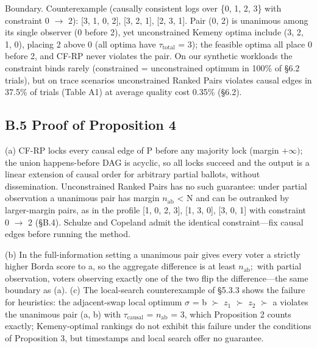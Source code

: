 \documentclass[11pt]{article}
\begin{document}
Boundary. Counterexample (causally consistent logs over \{0, 1, 2, 3\} with constraint 0 $\rightarrow $ 2): [3, 1, 0, 2], [3, 2, 1], [2, 3, 1]. Pair (0, 2) is unanimous among its single observer (0 before 2), yet unconstrained Kemeny optima include (3, 2, 1, 0), placing 2 above 0 (all optima have $\tau _{\mathrm{total}}$ = 3); the feasible optima all place 0 before 2, and CF-RP never violates the pair. On our synthetic workloads the constraint binds rarely (constrained = unconstrained optimum in 100\% of §6.2 trials), but on trace scenarios unconstrained Ranked Pairs violates causal edges in 37.5\% of trials (Table A1) at average quality cost 0.35\% (§6.2).

\subsection{B.5 Proof of Proposition 4}
(a) CF-RP locks every causal edge of P before any majority lock (margin $+\infty );$ the union happens-before DAG is acyclic, so all locks succeed and the output is a linear extension of causal order for arbitrary partial ballots, without dissemination. Unconstrained Ranked Pairs has no such guarantee: under partial observation a unanimous pair has margin $n_{\mathrm{ab}}$ < N and can be outranked by larger-margin pairs, as in the profile [1, 0, 2, 3], [1, 3, 0], [3, 0, 1] with constraint 0 $\rightarrow $ 2 (§B.4). Schulze and Copeland admit the identical constraint—fix causal edges before running the method.

(b) In the full-information setting a unanimous pair gives every voter a strictly higher Borda score to a, so the aggregate difference is at least $n_{\mathrm{ab}};$ with partial observation, voters observing exactly one of the two flip the difference—the same boundary as (a). (c) The local-search counterexample of §5.3.3 shows the failure for heuristics: the adjacent-swap local optimum $\sigma $ = b $\succ $ $z_{1}$ $\succ $ $z_{2}$ $\succ $ a violates the unanimous pair (a, b) with $\tau _{\mathrm{causal}}$ = $n_{\mathrm{ab}}$ = 3, which Proposition 2 counts exactly; Kemeny-optimal rankings do not exhibit this failure under the conditions of Proposition 3, but timestamps and local search offer no guarantee.
\end{document}
